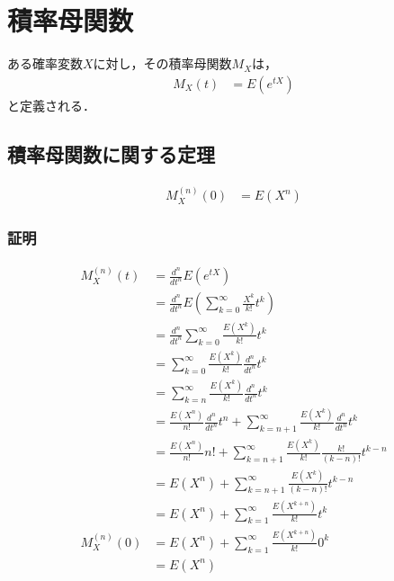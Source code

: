 \documentclass[dvipdfmx]{jsarticle}
\begin{document}
 \section{積率母関数}
ある確率変数$X$に対し，その積率母関数$M_X$は，
 \begin{align}
  M_X\left(t\right)&=E\left(e^{tX}\right)
 \end{align}
と定義される．
 \subsection{積率母関数に関する定理}
 \begin{align}
  M_X^{\left(n\right)}\left(0\right)&=E\left(X^n\right)
 \end{align}
 \subsubsection{証明}
 \begin{align}
  M_X^{\left(n\right)}\left(t\right)&=\frac{d^n}{dt^n}E\left(e^{tX}\right)\nonumber\\
  &=\frac{d^n}{dt^n}E\left(\sum_{k=0}^\infty \frac{X^k}{k!}t^k\right)\nonumber\\
  &=\frac{d^n}{dt^n}\sum_{k=0}^\infty \frac{E\left(X^k\right)}{k!}t^k\nonumber\\
  &=\sum_{k=0}^\infty \frac{E\left(X^k\right)}{k!}\frac{d^n}{dt^n}t^k\nonumber\\
  &=\sum_{k=n}^\infty \frac{E\left(X^k\right)}{k!}\frac{d^n}{dt^n}t^k\nonumber\\
  &=\frac{E\left(X^n\right)}{n!}\frac{d^n}{dt^n}t^n+\sum_{k=n+1}^\infty \frac{E\left(X^k\right)}{k!}\frac{d^n}{dt^n}t^k\nonumber\\
  &=\frac{E\left(X^n\right)}{n!}n!+\sum_{k=n+1}^\infty \frac{E\left(X^k\right)}{k!}\frac{k!}{\left(k-n\right)!}t^{k-n}\nonumber\\
  &=E\left(X^n\right)+\sum_{k=n+1}^\infty \frac{E\left(X^k\right)}{\left(k-n\right)!}t^{k-n}\nonumber\\
  &=E\left(X^n\right)+\sum_{k=1}^\infty \frac{E\left(X^{k+n}\right)}{k!}t^k\nonumber\\
  M_X^{\left(n\right)}\left(0\right)&=E\left(X^n\right)+\sum_{k=1}^\infty \frac{E\left(X^{k+n}\right)}{k!}0^k\nonumber\\
  &=E\left(X^n\right)
 \end{align}
\end{document}
